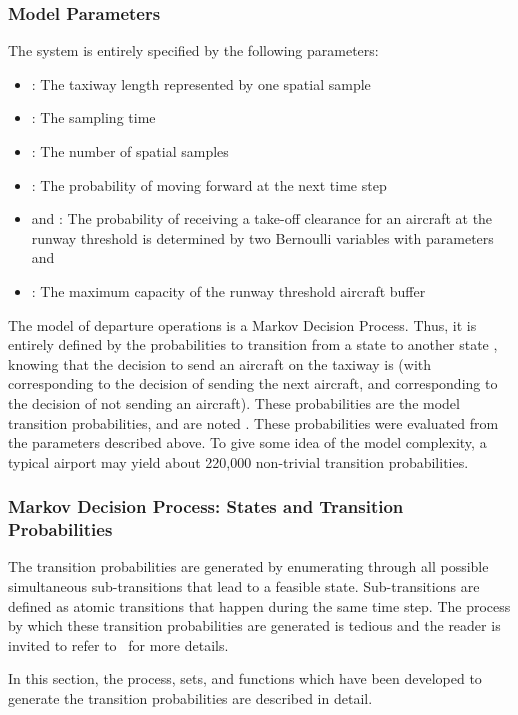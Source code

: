 \documentclass[letterpaper]{article}
\begin{document}
\subsubsection{Model Parameters}

The system is entirely specified by the following parameters:

\begin{itemize}
\item  : The taxiway length represented by one spatial sample
\item  : The sampling time
\item : The number of spatial samples
\item : The probability of moving forward at the next time step
\item  and : The probability of receiving a take-off clearance for an aircraft at the runway threshold is determined by two Bernoulli variables with parameters  and 
\item : The maximum capacity of the runway threshold aircraft buffer
\end{itemize}

The model of departure operations is a Markov Decision Process. 
Thus, it is entirely defined by the probabilities to transition from a state  to another state , 
knowing that  the decision to send an aircraft on the taxiway is  
(with  corresponding to the decision of sending the next aircraft, and  corresponding to the decision of not sending an aircraft). 
These probabilities are the model transition probabilities, and are noted . 
These probabilities were evaluated from the parameters described above. 
To give some idea of the model complexity, a typical airport may yield about 220,000 non-trivial transition probabilities.


\subsubsection{Markov Decision Process: States and Transition Probabilities} \label{s:transitions}

The transition probabilities are generated by enumerating through all possible simultaneous sub-transitions that lead to a feasible state. Sub-transitions are defined as atomic transitions that happen during the same time step. The process by which these transition probabilities are generated is tedious and the reader is invited to refer to~\cite{Bur:10} for more details.

\iffalse
In this section, the process, sets, and functions which have been developed to generate the transition probabilities are described in detail.
\end{document}
